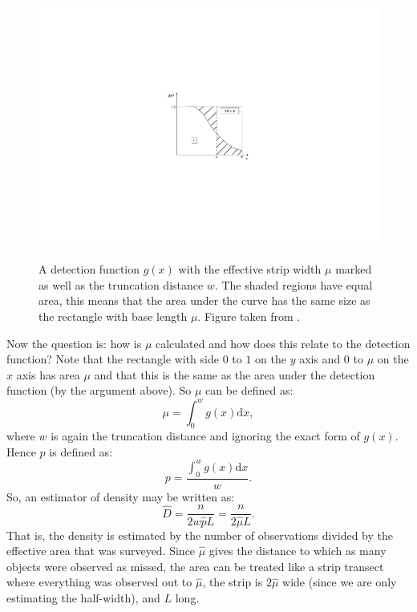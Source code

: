 \begin{figure}
\centering
\includegraphics{intro/figs/muexplanation.pdf}\\
\caption{A detection function $g(x)$ with the effective strip width $\mu$ marked as well as the truncation distance $w$. The shaded regions have equal area, this means that the area under the curve has the same size as the rectangle with base length $\mu$. Figure taken from .\label{cor-7s6}}
\label{ds-mu-explanation}
\end{figure}

Now the question is: how is $\mu$ calculated and how does this relate to the detection function? Note that the rectangle with side $0$ to $1$ on the $y$ axis and $0$ to $\mu$ on the $x$ axis has area $\mu$ and that this is the same as the area under the detection function (by the argument above). So $\mu$ can be defined as:
\begin{equation}
\mu = \int_0^w g(x) \text{d}x,
\label{ds-lt-mu-def}
\end{equation}
where $w$ is again the truncation distance and ignoring the exact form of $g(x)$. Hence $p$ is defined as:
\begin{equation*}
p = \frac{\int_0^w g(x) \text{d}x}{w}.
\end{equation*}
\label{cor-r59}So, an estimator of density may be written as:
\begin{equation*}
\hat{D}=\frac{n}{2 w\hat{p} L}=\frac{n}{2\hat{\mu}L}.
\end{equation*}
That is, the density is estimated by the number of observations divided by the effective area that was surveyed. Since $\hat{\mu}$ gives the distance to which as many objects were observed as missed, the area can be treated like a strip transect where everything was observed out to $\hat{\mu}$, the strip is $2\hat{\mu}$ wide (since we are only estimating the half-width), and $L$ long.

